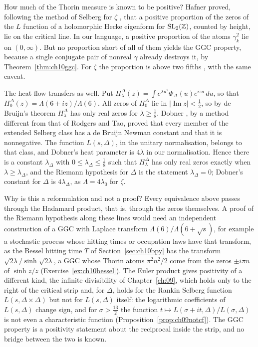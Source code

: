How much of the Thorin measure is known to be positive? Hafner \cite{hafner1983} proved, following the method of Selberg for $\zeta$ \cite{selberg1942}, that a positive proportion of the zeros of the $L$ function of a holomorphic Hecke eigenform for $\mathrm{SL}_2(\mathbb{Z})$, counted by height, lie on the critical line. In our language, a positive proportion of the atoms $\gamma_k^2$ lie on $(0,\infty)$. But no proportion short of all of them yields the GGC property, because a single conjugate pair of nonreal $\gamma$ already destroys it, by Theorem~\ref{thm:ch10ggc}. For $\zeta$ the proportion is above two fifths \cite{conrey1989}, with the same caveat.

The heat flow transfers as well. Put $H^\Delta_\lambda(z) = \int e^{\lambda u^2}\Phi_\Delta(u)e^{izu}\,du$, so that $H^\Delta_0(z) = \Lambda(6+iz)/\Lambda(6)$. All zeros of $H^\Delta_0$ lie in $|\operatorname{Im}z|<\frac12$, so by de Bruijn's theorem $H^\Delta_\lambda$ has only real zeros for $\lambda\ge\frac18$. Dobner \cite{dobner2021}, by a method different from that of Rodgers and Tao, proved that every member of the extended Selberg class has a de Bruijn Newman constant and that it is nonnegative. The function $L(s,\Delta)$, in the unitary normalisation, belongs to that class, and Dobner's heat parameter is $4\lambda$ in our normalisation. Hence there is a constant $\lambda_\Delta$ with $0\le\lambda_\Delta\le\frac18$ such that $H^\Delta_\lambda$ has only real zeros exactly when $\lambda\ge\lambda_\Delta$, and the Riemann hypothesis for $\Delta$ is the statement $\lambda_\Delta=0$; Dobner's constant for $\Delta$ is $4\lambda_\Delta$, as $\Lambda=4\lambda_0$ for $\zeta$.

\begin{remark}
Why is this a reformulation and not a proof? Every equivalence above passes through the Hadamard product, that is, through the zeros themselves. A proof of the Riemann hypothesis along these lines would need an independent construction of a GGC with Laplace transform $\Lambda(6)/\Lambda(6+\sqrt s)$, for example a stochastic process whose hitting times or occupation laws have that transform, as the Bessel hitting time $T$ of Section~\ref{sec:ch10bpy} has the transform $\sqrt{2\lambda}/\sinh\sqrt{2\lambda}$, a GGC whose Thorin atoms $\pi^2n^2/2$ come from the zeros $\pm i\pi n$ of $\sinh z/z$ (Exercise~\ref{ex:ch10bessel}). The Euler product gives positivity of a different kind, the infinite divisibility of Chapter~\ref{ch:09}, which holds only to the right of the critical strip and, for $\Delta$, holds for the Rankin Selberg function $L(s,\Delta\times\Delta)$ but not for $L(s,\Delta)$ itself: the logarithmic coefficients of $L(s,\Delta)$ change sign, and for $\sigma>\frac{13}{2}$ the function $t\mapsto L(\sigma+it,\Delta)/L(\sigma,\Delta)$ is not even a characteristic function (Proposition~\ref{prop:ch09notcf}). The GGC property is a positivity statement about the reciprocal inside the strip, and no bridge between the two is known.
\end{remark}

